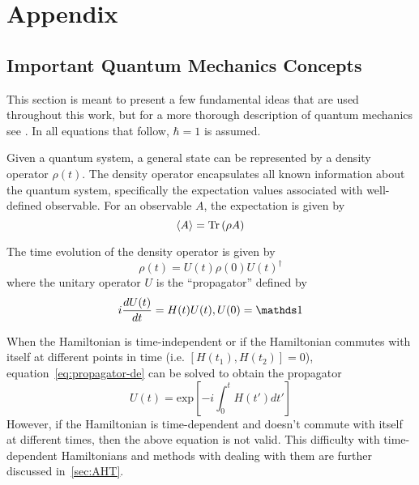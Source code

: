 \chapter{Appendix}

\section{Important Quantum Mechanics Concepts}

This section is meant to present a few fundamental ideas that are used throughout this work, but for a more thorough description of quantum mechanics see
\cite{mcintyre2012quantum, sakurai2017modern}.
In all equations that follow, $\hbar = 1$ is assumed.

Given a quantum system, a general state can be represented by a density operator $\rho(t)$. The density operator encapsulates all known information about the quantum system, specifically the expectation values associated with well-defined observable. For an observable $A$, the expectation is given by
\begin{equation}\label{eq:measure}
    \langle A \rangle = \text{Tr}\left( \rho A \right)
\end{equation}

The time evolution of the density operator is given by
\begin{equation}\label{eq:density-time}
    \rho(t) = U(t) \rho(0) U(t)^\dagger
\end{equation}
where the unitary operator $U$ is the ``propagator'' defined by
\begin{equation}\label{eq:propagator-de}
    i \ddt{U(t)} = H(t) U(t), U(0) = \identity
\end{equation}

When the Hamiltonian is time-independent or if the Hamiltonian commutes with itself at different points in time (i.e. $[H(t_1), H(t_2)] = 0$), equation~\ref{eq:propagator-de} can be solved to obtain the propagator
\begin{equation}\label{eq:propagator-ti}
    U(t) = \text{exp}\left[ {-i \int_0^t H(t') dt'} \right]
\end{equation}
However, if the Hamiltonian is time-dependent and doesn't commute with itself at different times, then the above equation is not valid. This difficulty with time-dependent Hamiltonians and methods with dealing with them are further discussed in~\ref{sec:AHT}.

